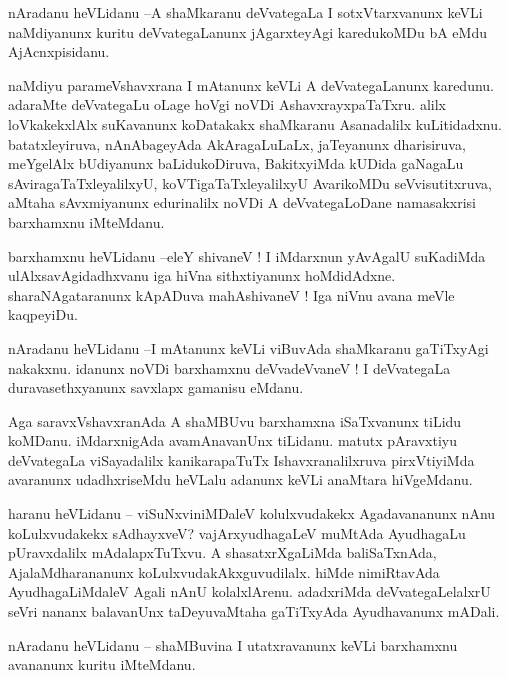 \documentclass{article}
\begin{document}
\begin{mn}%
nAradanu heVLidanu --A shaMkaranu deVvategaLa I sotxVtarxvanunx keVLi naMdiyanunx kuritu 
deVvategaLanunx jAgarxteyAgi karedukoMDu bA eMdu AjAcnxpisidanu.
\end{mn}

\begin{mn}%
naMdiyu parameVshavxrana I mAtanunx keVLi A deVvategaLanunx karedunu. adaraMte deVvategaLu 
oLage hoVgi noVDi AshavxrayxpaTaTxru. alilx loVkakekxlAlx suKavanunx koDatakakx shaMkaranu 
Asanadalilx kuLitidadxnu. batatxleyiruva, nAnAbageyAda AkAragaLuLaLx, jaTeyanunx 
dharisiruva, meYgelAlx bUdiyanunx baLidukoDiruva, BakitxyiMda kUDida gaNagaLu 
sAviragaTaTxleyalilxyU, koVTigaTaTxleyalilxyU AvarikoMDu seVvisutitxruva, aMtaha 
sAvxmiyanunx edurinalilx noVDi A deVvategaLoDane namasakxrisi barxhamxnu iMteMdanu.
\end{mn}

\begin{mn}%
barxhamxnu heVLidanu --eleY shivaneV ! I iMdarxnun yAvAgalU suKadiMda ulAlxsavAgidadhxvanu 
iga hiVna sithxtiyanunx hoMdidAdxne. sharaNAgataranunx kApADuva mahAshivaneV ! Iga niVnu 
avana meVle kaqpeyiDu.
\end{mn}

\begin{mn}%
nAradanu heVLidanu --I mAtanunx keVLi viBuvAda shaMkaranu gaTiTxyAgi nakakxnu. idanunx noVDi 
barxhamxnu deVvadeVvaneV ! I deVvategaLa duravasethxyanunx savxlapx gamanisu eMdanu.
\end{mn}

\begin{mn}%
Aga saravxVshavxranAda A shaMBUvu barxhamxna iSaTxvanunx tiLidu koMDanu. iMdarxnigAda 
avamAnavanUnx tiLidanu. matutx pAravxtiyu deVvategaLa viSayadalilx kanikarapaTuTx 
Ishavxranalilxruva pirxVtiyiMda avaranunx udadhxriseMdu heVLalu adanunx keVLi anaMtara 
hiVgeMdanu.
\end{mn}

\begin{mn}%
haranu heVLidanu -- viSuNxviniMDaleV kolulxvudakekx Agadavananunx nAnu koLulxvudakekx 
sAdhayxveV? vajArxyudhagaLeV muMtAda AyudhagaLu pUravxdalilx mAdalapxTuTxvu. A 
shasatxrXgaLiMda baliSaTxnAda, AjalaMdharananunx koLulxvudakAkxguvudilalx. hiMde 
nimiRtavAda AyudhagaLiMdaleV Agali nAnU kolalxlArenu. adadxriMda deVvategaLelalxrU seVri 
nananx balavanUnx taDeyuvaMtaha gaTiTxyAda Ayudhavanunx mADali.
\end{mn}

\begin{mn}%
nAradanu heVLidanu -- shaMBuvina I utatxravanunx keVLi barxhamxnu avananunx kuritu iMteMdanu.
\end{mn}
\end{document}
